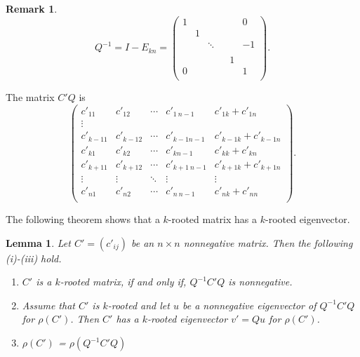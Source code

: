 \documentclass{article}
\theoremstyle{plain}
\newtheorem{lem}[thm]{Lemma}
\theoremstyle{definition}
\newtheorem{rem}[thm]{Remark}
\begin{document}
\begin{rem}

    $$Q^{-1}=I-E_{kn}=\begin{pmatrix}
    1 &  & & &  & 0 \\
    & 1 &  &      &  &  \\
    &  & \ddots & &  & -1 \\
    &  &        & &  &  \\
    &  & & & 1 &  \\
    0 &  & & &  & 1 \\
    \end{pmatrix}.$$

    The matrix $C'Q$ is
    $$\begin{pmatrix}
    c'_{11}     & c'_{12} & \cdots     & c'_{1\ n-1} & c'_{1k}+c'_{1n} \\
    \vdots \\
    c'_{k-11}     & c'_{k-1 2}           & \cdots     & c'_{k-1 n-1} & c'_{k-1k}+c'_{k-1n} \\
    c'_{k1} & c'_{k2} &\cdots      & c'_{kn-1} & c'_{kk}+c'_{kn}\\
    c'_{k+11}     & c'_{k+12}           & \cdots     & c'_{k+1\ n-1} & c'_{k+1k}+c'_{k+1n} \\
    \vdots              & \vdots & \ddots              & \vdots & \vdots \\
    c'_{n1}             & c'_{n2} & \cdots             & c'_{n\ n-1} & c'_{nk}+c'_{nn} \\
    \end{pmatrix}.
    $$
\end{rem}

The following theorem shows that a $k$-rooted matrix has a $k$-rooted eigenvector.
\begin{lem}\label{lma_m_rooted}
    Let $C'=(c'_{ij})$ be an $n\times n$ nonnegative matrix. Then the following (i)-(iii) hold.
        \begin{enumerate}[label=(\roman*)]
            \item $C'$ is a $k$-rooted matrix, if and only if, $Q^{-1}C'Q$ is nonnegative.
            \item Assume that $C'$ is $k$-rooted and let $u$ be a nonnegative eigenvector of $Q^{-1}C'Q$
                for $\rho(C')$. Then  $C'$ has a $k$-rooted eigenvector $v'=Qu$ for $\rho(C')$. 
            \item $\rho(C')$ = $\rho(Q^{-1}C'Q)$
        \end{enumerate}
\end{lem}
  
\end{document}
